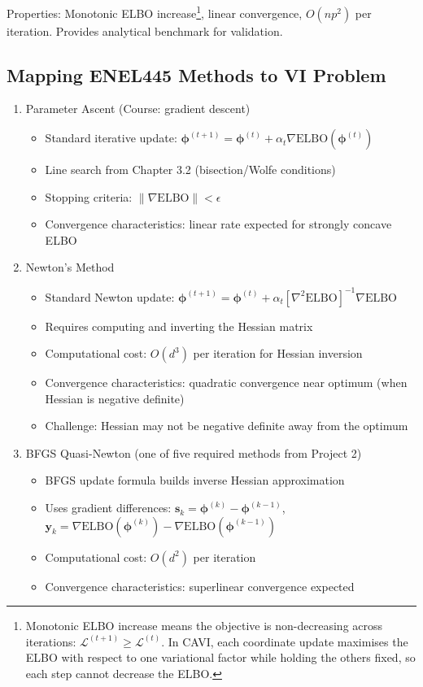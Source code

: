 \documentclass[11pt,a4paper]{article}
\newcommand{\ELBO}{\text{ELBO}}
\begin{document}
Properties: Monotonic ELBO increase\footnote{Monotonic ELBO increase means the objective is non-decreasing across iterations: $\mathcal{L}^{(t+1)} \ge \mathcal{L}^{(t)}$. In CAVI, each coordinate update maximises the ELBO with respect to one variational factor while holding the others fixed, so each step cannot decrease the ELBO.}, linear convergence, $O(np^2)$ per iteration. Provides analytical benchmark for validation.

\newpage 

\subsection*{Mapping ENEL445 Methods to VI Problem}

\begin{enumerate}[leftmargin=*]
\item Parameter Ascent (Course: gradient descent)
\begin{itemize}
\item Standard iterative update: $\bm{\phi}^{(t+1)} = \bm{\phi}^{(t)} + \alpha_t \nabla \ELBO(\bm{\phi}^{(t)})$
\item Line search from Chapter 3.2 (bisection/Wolfe conditions)
\item Stopping criteria: $\|\nabla \ELBO\| < \epsilon$
\item Convergence characteristics: linear rate expected for strongly concave ELBO
\end{itemize}

\item Newton's Method   
\begin{itemize}
\item Standard Newton update: $\bm{\phi}^{(t+1)} = \bm{\phi}^{(t)} + \alpha_t [\nabla^2 \ELBO]^{-1} \nabla \ELBO$
\item Requires computing and inverting the Hessian matrix
\item Computational cost: $O(d^3)$ per iteration for Hessian inversion
\item Convergence characteristics: quadratic convergence near optimum (when Hessian is negative definite)
\item Challenge: Hessian may not be negative definite away from the optimum
\end{itemize}

\item BFGS Quasi-Newton (one of five required methods from Project 2)
\begin{itemize}
\item BFGS update formula builds inverse Hessian approximation
\item Uses gradient differences: $\bm{s}_k = \bm{\phi}^{(k)} - \bm{\phi}^{(k-1)}$, $\bm{y}_k = \nabla \ELBO(\bm{\phi}^{(k)}) - \nabla \ELBO(\bm{\phi}^{(k-1)})$ 
\item Computational cost: $O(d^2)$ per iteration
\item Convergence characteristics: superlinear convergence expected
\end{itemize}
\end{enumerate}
\end{document}

